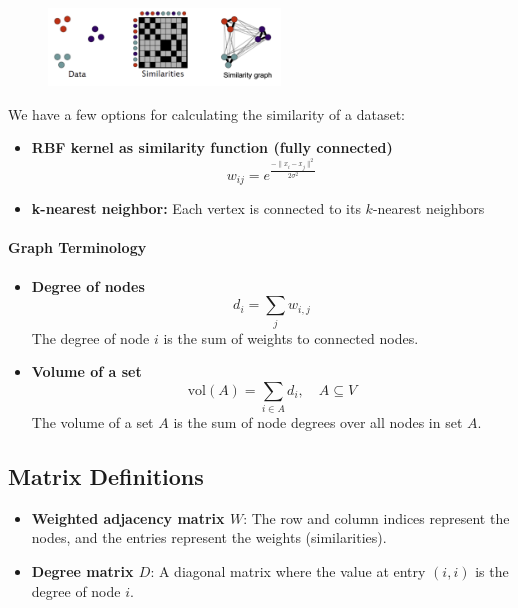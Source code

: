 \documentclass[11pt]{article}
\begin{document}
\begin{figure}[h]
	\centering
	\includegraphics[width=0.55\textwidth]{../imgs/sim-graph.png} %
\end{figure}

We have a few options for calculating the similarity of a dataset: 

\begin{itemize}
    \item \textbf{RBF kernel as similarity function (fully connected)} \hfill 
    \[
        w_{ij} = e^{\frac{-\|x_i - x_j\|^2}{2\sigma^2}}
    \]
    
    \item \textbf{k-nearest neighbor:} Each vertex is connected to its \( k \)-nearest neighbors
\end{itemize}

\paragraph*{Graph Terminology}

\begin{itemize}
    \item \textbf{Degree of nodes}
    \[
        d_i = \sum_j w_{i,j}
    \]
    The degree of node \(i\) is the sum of weights to connected nodes.

    \item \textbf{Volume of a set}
    \[
        \text{vol}(A) = \sum_{i \in A} d_i, \quad A \subseteq V
    \]
    The volume of a set \(A\) is the sum of node degrees over all nodes in set \(A\).
\end{itemize}

\vspace{1em}

\subsection*{Matrix Definitions}

\begin{itemize}
    \item \textbf{Weighted adjacency matrix \(W\)}: 
    The row and column indices represent the nodes, and the entries represent the weights (similarities).

    \item \textbf{Degree matrix \(D\)}: 
    A diagonal matrix where the value at entry \((i, i)\) is the degree of node \(i\).
\end{itemize}
\end{document}
